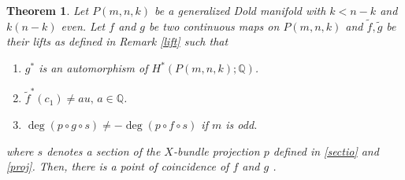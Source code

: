 \documentclass{amsart}
\newtheorem{theorem}{Theorem}[section]
\begin{document}
\begin{theorem}\label{coincidence thm}
	Let $P(m,n,k)$ be a generalized Dold manifold with $k<n-k$ and $k(n-k)$ even. Let $f$ and $g$ be two continuous maps on $P(m,n,k)$ and $\tilde f, \tilde g$ be their lifts as defined in  Remark \ref{lift} such %
that
	\begin{enumerate}	
		\item $g^*$ %
is an automorphism %
of $H^*(P(m,n,k);\mathbb Q)$. 
		\item $\tilde{f}^*(c_1) \neq au,\, a \in \mathbb{Q}$.
		\item $\deg(p\circ g \circ s)\neq -\deg (p\circ f\circ s)$ %
if $m$ %
is odd.
	\end{enumerate}
	where %
$s$ denotes a section of the $X$-bundle projection $p$ defined in \eqref{sectio} and \eqref{proj}.	Then, there is a point of coincidence of $f$ and  $g$%
.
\end{theorem}
\end{document}
